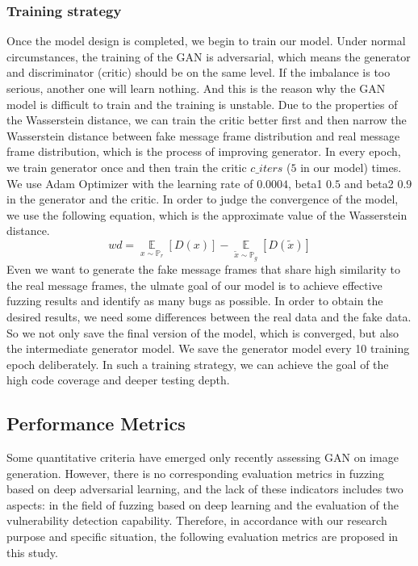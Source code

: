 \subsubsection{\textbf{Training strategy}}
Once the model design is completed, we begin to train our model. Under normal circumstances, the training of the GAN is adversarial, which means the generator and discriminator (critic) should be on the same level. If the imbalance is too serious, another one will learn nothing. And this is the reason why the GAN model is difficult to train and the training is unstable.
Due to the properties of the Wasserstein distance, we can train the critic better first and then narrow the Wasserstein distance between fake message frame distribution and real message frame distribution, which is the process of improving generator. In every epoch, we train generator once and then train the critic $c\_iters$ ($5$ in our model) times. We use Adam Optimizer with the learning rate of $0.0004$, beta1 $0.5$ and beta2 $0.9$ in the generator and the critic. In order to judge the convergence of the model, we use the following equation, which is the approximate value of the Wasserstein distance.
\begin{equation}
wd = 
\mathop{\mathbb{E}}\limits_{x\sim\mathbb{P}_{r}}\left [ D(x) \right ] 
- \mathop{\mathbb{E}}\limits_{\tilde{x}\sim\mathbb{P}_{g}}\left [ D(\tilde{x}) \right ] 
\end{equation}
Even we want to generate the fake message frames that share high similarity to the real message frames, the ulmate goal of our model is to achieve effective fuzzing results and identify as many bugs as possible. In order to obtain the desired results, we need some differences between the real data and the fake data. So we not only save the final version of the model, which is converged, but also the intermediate generator model. We save the generator model every 10 training epoch deliberately. In such a training strategy, we can achieve the goal of the high code coverage and deeper testing depth.

\subsection{Performance Metrics}
Some quantitative criteria \cite{heusel2017gans} \cite{karras2017progressive} \cite{lucic2018gans} have emerged only recently assessing GAN on image generation. However, there is no corresponding evaluation metrics in fuzzing based on deep adversarial learning, and the lack of these indicators includes two aspects:  
 \cite{karras2017progressive} \cite{lucic2018gans} in the field of fuzzing based on deep learning \cite{shmelkov2018good} and the evaluation of the vulnerability detection capability. Therefore, in accordance with our research purpose and specific situation, the following evaluation metrics are proposed in this study.

